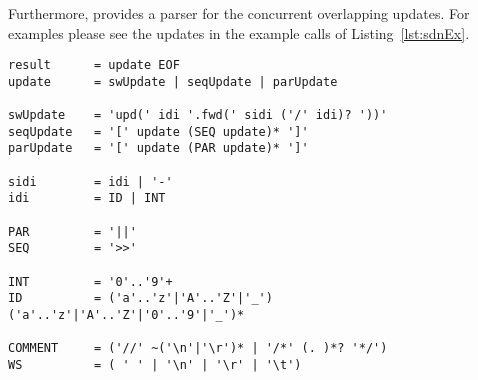 \documentclass[12pt,twoside,a4paper,openright]{memoir}
\begin{document}
Furthermore, \tool{} provides a parser for the concurrent overlapping updates.
For examples please see the updates in the example calls of Listing~\ref{lst:sdnEx}.
\begin{lstlisting}[captionpos=b, caption=Grammar of the concurrent overlapping updates of SDNs., label = lst:grammar,language=ebnf]
result     	= update EOF
update      = swUpdate | seqUpdate | parUpdate

swUpdate    = 'upd(' idi '.fwd(' sidi ('/' idi)? '))'
seqUpdate   = '[' update (SEQ update)* ']'
parUpdate   = '[' update (PAR update)* ']'

sidi		= idi | '-'
idi 		= ID | INT

PAR 		= '||'
SEQ 		= '>>'

INT			= '0'..'9'+
ID  		= ('a'..'z'|'A'..'Z'|'_') ('a'..'z'|'A'..'Z'|'0'..'9'|'_')*

COMMENT		= ('//' ~('\n'|'\r')* | '/*' (. )*? '*/')
WS			= ( ' ' | '\n' | '\r' | '\t')
\end{lstlisting}
\end{document}

